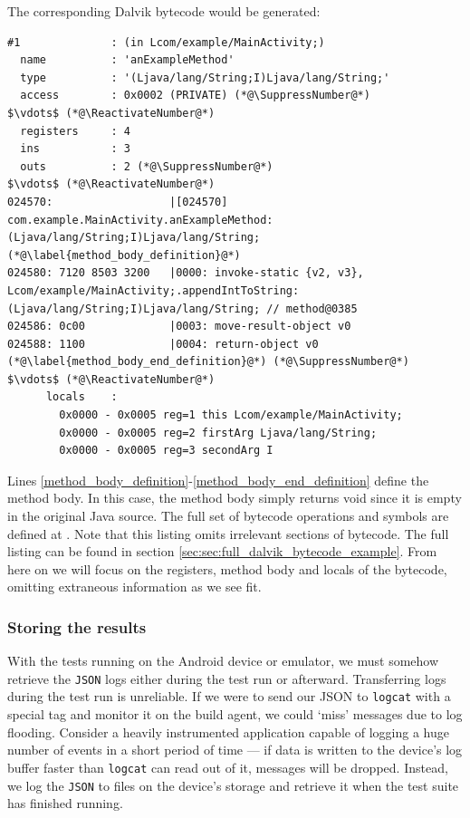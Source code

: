 The corresponding Dalvik bytecode would be generated:

\begin{lstlisting}[mathescape,numberblanklines=false]
#1              : (in Lcom/example/MainActivity;)
  name          : 'anExampleMethod'
  type          : '(Ljava/lang/String;I)Ljava/lang/String;'
  access        : 0x0002 (PRIVATE) (*@\SuppressNumber@*)
$\vdots$ (*@\ReactivateNumber@*)
  registers     : 4
  ins           : 3
  outs          : 2 (*@\SuppressNumber@*)
$\vdots$ (*@\ReactivateNumber@*)
024570:                  |[024570] com.example.MainActivity.anExampleMethod:(Ljava/lang/String;I)Ljava/lang/String; (*@\label{method_body_definition}@*)
024580: 7120 8503 3200   |0000: invoke-static {v2, v3}, Lcom/example/MainActivity;.appendIntToString:(Ljava/lang/String;I)Ljava/lang/String; // method@0385
024586: 0c00             |0003: move-result-object v0
024588: 1100             |0004: return-object v0 (*@\label{method_body_end_definition}@*) (*@\SuppressNumber@*)
$\vdots$ (*@\ReactivateNumber@*)
      locals    :
        0x0000 - 0x0005 reg=1 this Lcom/example/MainActivity;
        0x0000 - 0x0005 reg=2 firstArg Ljava/lang/String;
        0x0000 - 0x0005 reg=3 secondArg I
\end{lstlisting}


Lines \ref{method_body_definition}-\ref{method_body_end_definition} define the method body. In this case, the method body simply returns void since it is empty in the original Java source. The full set of bytecode operations and symbols are defined at \cite{dalvikBytecode}. Note that this listing omits irrelevant sections of bytecode. The full listing can be found in section \ref{sec:sec:full_dalvik_bytecode_example}. From here on we will focus on the registers, method body and locals of the bytecode, omitting extraneous information as we see fit.



\subsubsection{Storing the results}

With the tests running on the Android device or emulator, we must somehow retrieve the {\tt JSON} logs either during the test run or afterward. Transferring logs during the test run is unreliable. If we were to send our JSON to {\tt logcat} with a special tag and monitor it on the build agent, we could {\lq}miss{\rq} messages due to log flooding. Consider a heavily instrumented application capable of logging a huge number of events in a short period of time --- if data is written to the device's log buffer faster than {\tt logcat} can read out of it, messages will be dropped. Instead, we log the {\tt JSON} to files on the device's storage and retrieve it when the test suite has finished running.

